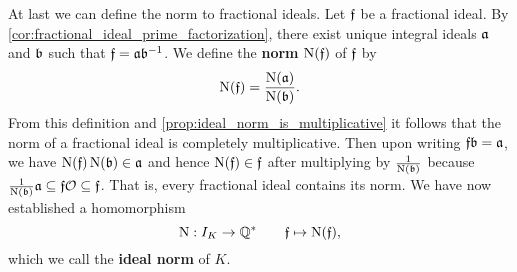 \documentclass[12pt,oneside]{book}
\begin{document}
    At last we can define the norm to fractional ideals. Let $\mathfrak{f}$ be a fractional ideal. By \cref{cor:fractional_ideal_prime_factorization}, there exist unique integral ideals $\mathfrak{a}$ and $\mathfrak{b}$ such that $\mathfrak{f} = \mathfrak{a}\mathfrak{b}^{-1}$. We define the \textbf{norm} $\operatorname{\mathrm{N}}(\mathfrak{f})$ of $\mathfrak{f}$ by
    \[
      \operatorname{\mathrm{N}}(\mathfrak{f}) = \frac{\operatorname{\mathrm{N}}(\mathfrak{a})}{\operatorname{\mathrm{N}}(\mathfrak{b})}.
    \]
    From this definition and \cref{prop:ideal_norm_is_multiplicative} it follows that the norm of a fractional ideal is completely multiplicative. Then upon writing $\mathfrak{f}\mathfrak{b} = \mathfrak{a}$, we have $\operatorname{\mathrm{N}}(\mathfrak{f})\operatorname{\mathrm{N}}(\mathfrak{b}) \in \mathfrak{a}$ and hence $\operatorname{\mathrm{N}}(\mathfrak{f}) \in \mathfrak{f}$ after multiplying by $\frac{1}{\operatorname{\mathrm{N}}(\mathfrak{b})}$ because $\frac{1}{\operatorname{\mathrm{N}}(\mathfrak{b})}\mathfrak{a} \subseteq \mathfrak{f}\mathcal{O} \subseteq \mathfrak{f}$. That is, every fractional ideal contains its norm. We have now established a homomorphism
    \[
      \operatorname{\mathrm{N}}:I_{K} \to \mathbb{Q}^{\ast} \qquad \mathfrak{f} \mapsto \operatorname{\mathrm{N}}(\mathfrak{f}),
    \]
    which we call the \textbf{ideal norm} of $K$.
  
\end{document}
